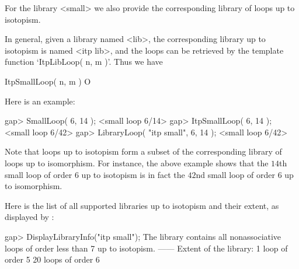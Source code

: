 For the library <small> we also provide the corresponding library of loops up
to isotopism.

In general, given a library named <lib>, the corresponding library up to
isotopism is named <itp lib>, and the loops can be retrieved by the template
function `ItpLibLoop( n, m )'. Thus we have

\>ItpSmallLoop( n, m ) O

Here is an example:

\beginexample
gap> SmallLoop( 6, 14 );
<small loop 6/14>
gap> ItpSmallLoop( 6, 14 );
<small loop 6/42>
gap> LibraryLoop( "itp small", 6, 14 );
<small loop 6/42>
\endexample

Note that loops up to isotopism form a subset of the corresponding library of
loops up to isomorphism. For instance, the above example shows that the $14$th
small loop of order $6$ up to isotopism is in fact the $42$nd small loop of
order $6$ up to isomorphism.

Here is the list of all supported libraries up to isotopism and their extent,
as displayed by \LOOPS:

\beginexample
gap> DisplayLibraryInfo("itp small");
The library contains all nonassociative loops of order less than 7 up to
isotopism.
------
Extent of the library:
   1 loop of order 5
   20 loops of order 6
\endexample

